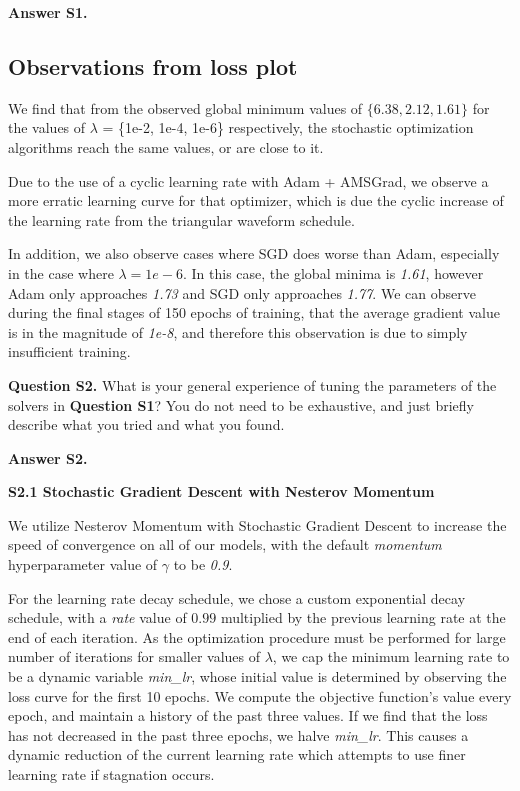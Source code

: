 \documentclass[11pt]{report}
\begin{document}
{\bf Answer S1.}
%
\subsection{Observations from loss plot}

We find that from the observed global minimum values of $\{6.38, 2.12, 1.61\}$ for the values of $\lambda$ = \{1e{-2}, 1e{-4}, 1e{-6}\} respectively, the stochastic optimization algorithms reach the same values, or are close to it.

Due to the use of a cyclic learning rate with Adam + AMSGrad, we observe a more erratic learning curve for that optimizer, which is due the cyclic increase of the learning rate from the triangular waveform schedule. 

In addition, we also observe cases where SGD does worse than Adam, especially in the case where $\lambda = 1e-6$. In this case, the global minima is \textit{1.61}, however Adam only approaches \textit{1.73} and SGD only approaches \textit{1.77}. We can observe during the final stages of 150 epochs of training, that the average gradient value is in the magnitude of \textit{1e-8}, and therefore this observation is due to simply insufficient training.



{\bf Question S2.}
What is your general experience of tuning the parameters of the solvers in {\bf Question S1}?
You do not need to be exhaustive, and just briefly describe what you tried and what you found.

{\bf Answer S2.}
%

{\bf S2.1 Stochastic Gradient Descent with Nesterov Momentum}

We utilize Nesterov Momentum with Stochastic Gradient Descent to increase the speed of convergence on all of our models, with the default \textit{momentum} hyperparameter value of $\gamma$ to be \textit{0.9}. 

For the learning rate decay schedule, we chose a custom exponential decay schedule, with a \textit{rate} value of $0.99$ multiplied by the previous learning rate at the end of each iteration. As the optimization procedure must be performed for large number of iterations for smaller values of $\lambda$, we cap the minimum learning rate to be a dynamic variable \textit{min\_lr}, whose initial value is determined by observing the loss curve for the first 10 epochs. We compute the objective function's value every epoch, and maintain a history of the past three values. If we find that the loss has not decreased in the past three epochs, we halve \textit{min\_lr}. This causes a dynamic reduction of the current learning rate which attempts to use finer learning rate if stagnation occurs. 
\end{document}
